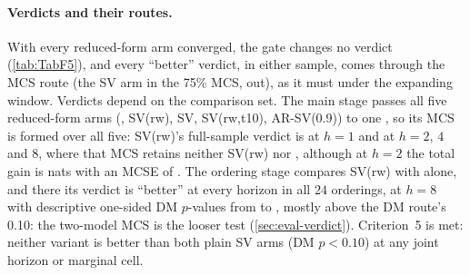 \paragraph{Verdicts and their routes.}
With every reduced-form arm converged, the gate changes no verdict (\cref{tab:TabF5}), %
and every ``better'' verdict, in either sample, comes through the MCS route (the SV arm in the 75\%
MCS,  out), as it must under the expanding window. %
Verdicts depend on the comparison set. The main stage passes all five reduced-form arms
(, SV(rw), SV, SV(rw,t10), AR-SV(0.9)) to one , so its MCS is formed
over all five: SV(rw)'s full-sample verdict is
 at $h = 1$ and
 at $h = 2$, $4$ and
$8$, where that MCS retains neither SV(rw) nor , although at $h = 2$ the total gain is
 nats with an MCSE of
. The ordering stage
compares SV(rw) with  alone, and there its verdict is ``better'' at every horizon in
all $24$ orderings, at $h = 8$ with descriptive one-sided DM $p$-values from
 to
,
mostly above the DM route's 0.10: the two-model MCS is the looser test
(\cref{sec:eval-verdict}). %
Criterion~5 is met: neither variant is better than both plain SV arms (DM $p < 0.10$) at any joint
horizon or marginal cell. %


